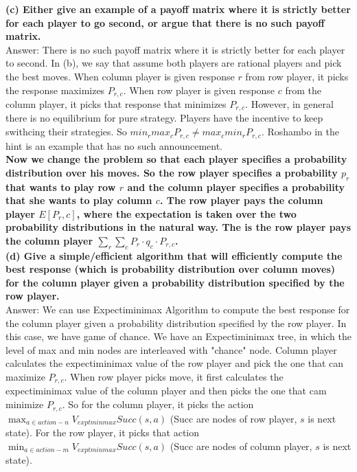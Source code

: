 \documentclass{article}
\begin{document}
\textbf{(c) Either give an example of a payoff matrix where it is strictly better for each player to go second, or argue that there is no such payoff matrix.} \\ \newline
Answer: There is no such payoff matrix where it is strictly better for each player to second. In (b), we say that assume both players are rational players and pick the best moves. When column player is given response $r$ from row player, it picks the response maximizes $P_{r,c}$. When row player is given response $c$ from the column player, it picks that response that minimizes $P_{r,c}$. However, in general there is no equilibrium for pure strategy. Players have the incentive to keep swithcing their strategies. So $min_{r}max_{c}P_{r,c} \neq max_{c}min_{r}P_{r,c}$. Roshambo in the hint is an example that has no such announcement. \\\newline
\textbf{Now we change the problem so that each player specifies a probability distribution over his moves. So the row player specifies a probability $p_r$ that wants to play row $r$ and the column player specifies a probability  that she wants to play column $c$. The row player pays the column player $E[P_r,c]$, where the expectation is taken over the two probability distributions in the natural way. The is the row player pays the column player $\sum_r\sum_c P_r \cdot q_c \cdot P_{r,c}$.} \\ \newline
\textbf{(d) Give a simple/efficient algorithm that will efficiently compute the best response (which is probability distribution over column moves) for the column player given a probability distribution specified by the row player.} \\ \newline
Answer: We can use Expectiminimax Algorithm to compute the best response for the column player given a probability distribution specified by the row player. In this case, we have game of chance. We have an Expectiminimax tree, in which the level of max and min nodes are interleaved with "chance" node. Column player calculates the expectiminimax value of the row player and pick the one that can maximize $P_{r,c}$. When row player picks move, it first calculates the expectiminimax value of the column player and then picks the one that cam minimize $P_{r,c}$. So for the column player, it picks the action $\max_{a\in action-n}V_{exptminmax}Succ(s, a)$ (Succ are nodes of row player, $s$ is next state). For the row player, it picks that action $\min_{a\in action-m}V_{exptminmax}Succ(s, a)$ (Succ are nodes of column player, $s$ is next state).\\ \newline
\end{document}
